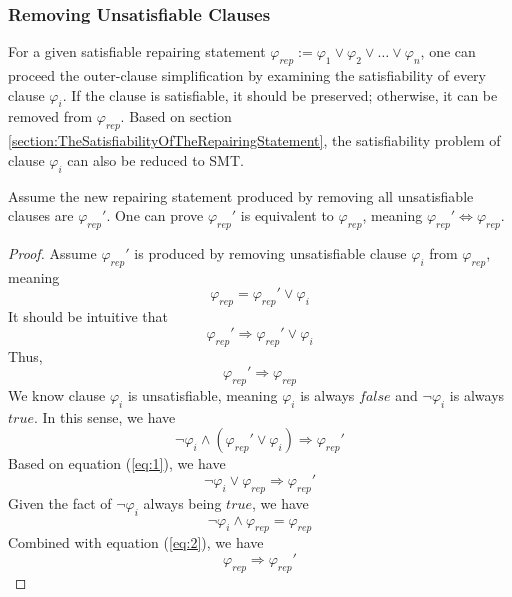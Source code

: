\subsubsection{Removing Unsatisfiable Clauses}
\label{section:RemovingUnsatisfiableClauses}
For a given satisfiable repairing statement $\varphi _{rep} := \varphi _{1} \vee \varphi _{2} \vee \dots \vee \varphi _{n}$, one can proceed the outer-clause simplification by examining the satisfiability of every clause $\varphi _{i}$.
If the clause is satisfiable, it should be preserved; otherwise, it can be removed from $\varphi _{rep}$.
Based on section \ref{section:TheSatisfiabilityOfTheRepairingStatement}, the satisfiability problem of clause $\varphi _{i}$ can also be reduced to SMT.

Assume the new repairing statement produced by removing all unsatisfiable clauses are $\varphi _{rep}'$.
One can prove $\varphi _{rep}'$ is equivalent to $\varphi _{rep}$, meaning $\varphi _{rep}' \Longleftrightarrow \varphi _{rep}$.

\begin{proof}
Assume $\varphi _{rep}'$ is produced by removing unsatisfiable clause $\varphi _{i}$ from $\varphi _{rep}$, meaning
\begin{equation}
\label{eq:1}
\varphi _{rep} = \varphi _{rep}' \vee \varphi _{i}
\end{equation}
It should be intuitive that
\begin{equation}
\varphi _{rep}' \Longrightarrow \varphi _{rep}' \vee \varphi _{i}
\end{equation}
Thus,
\begin{equation}
\varphi _{rep}' \Longrightarrow \varphi _{rep}
\end{equation}
We know clause $\varphi _{i}$ is unsatisfiable, meaning $\varphi _{i}$ is always $false$ and $\neg \varphi _{i}$ is always $true$. In this sense, we have
\begin{equation}
\neg \varphi _{i} \wedge (\varphi _{rep}' \vee \varphi _{i}) \Longrightarrow \varphi _{rep}'
\end{equation}
Based on equation (\ref{eq:1}), we have
\begin{equation}
\label{eq:2}
\neg \varphi _{i} \vee \varphi _{rep} \Longrightarrow \varphi _{rep}'
\end{equation}
Given the fact of $\neg \varphi _{i}$ always being $true$, we have
\begin{equation}
\neg \varphi _{i} \wedge \varphi _{rep} = \varphi _{rep}
\end{equation}
Combined with equation (\ref{eq:2}), we have
\begin{equation}
\varphi _{rep} \Longrightarrow \varphi _{rep}'
\end{equation}
\end{proof}

